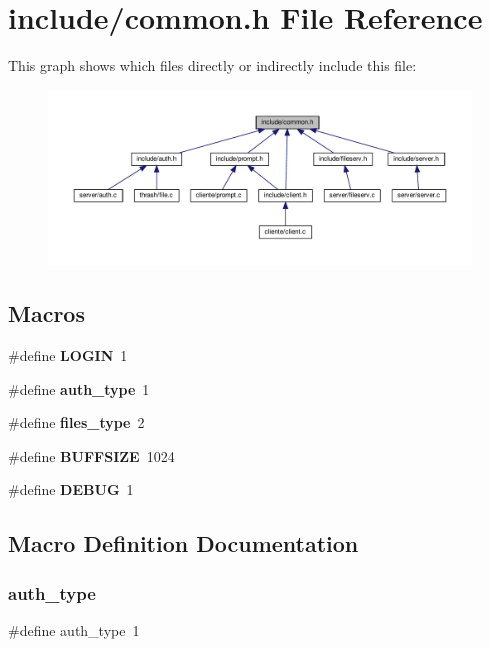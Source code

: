 \section{include/common.h File Reference}
\label{common_8h}
This graph shows which files directly or indirectly include this file\+:
\nopagebreak
\begin{figure}[H]
\begin{center}
\leavevmode
\includegraphics[width=350pt]{common_8h__dep__incl}
\end{center}
\end{figure}
\subsection*{Macros}
\begin{DoxyCompactItemize}
\item 
\#define \textbf{ L\+O\+G\+IN}~1
\item 
\#define \textbf{ auth\+\_\+type}~1
\item 
\#define \textbf{ files\+\_\+type}~2
\item 
\#define \textbf{ B\+U\+F\+F\+S\+I\+ZE}~1024
\item 
\#define \textbf{ D\+E\+B\+UG}~1
\end{DoxyCompactItemize}


\subsection{Macro Definition Documentation}
\mbox{\label{common_8h_aeccf496f78c1193cbacd50d37bf8fa2d}} 
\subsubsection{auth\+\_\+type}
{\footnotesize\ttfamily \#define auth\+\_\+type~1}

\mbox{\label{common_8h_a39912bfe2a55f30e269196f9141d845d}} 
